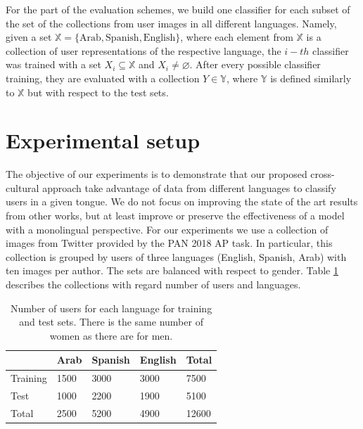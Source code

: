 \documentclass[runningheads]{llncs}
\begin{document}
For the part of the evaluation schemes, we build one classifier for each subset of the set of the collections from user images in all different languages.
Namely, given a set $\mathbb{X} = \{\text{Arab}, 
\text{Spanish}, \text{English}\}$, where each element
from $\mathbb{X}$ is a collection of user representations
of the respective language, the $i-th$ classifier was trained
with a set $X_i \subseteq \mathbb{X}$ and $X_i \neq \varnothing$.
After every possible classifier training, they are evaluated with a collection 
$Y \in \mathbb{Y}$, where $\mathbb{Y}$ is defined similarly to
$\mathbb{X}$ but with respect to the test sets.
 


\section{Experimental setup}


The objective of our experiments is to demonstrate that our
proposed cross-cultural approach take advantage of data from
different languages to classify users in a given tongue.
We do not focus on improving the state of the art results from
other works, but at least improve or preserve the effectiveness of a model with a 
monolingual perspective. For our experiments
we use a collection of images from Twitter provided by the PAN 2018 AP task.
In particular, this collection is grouped by users of three languages (English, 
Spanish, Arab) with ten images per author. The sets are balanced with respect
to gender. Table \ref{table-datasets} describes the collections with regard
number of users and languages.


\begin{table}[]
\centering
\caption{Number of users for each language for training and test sets. There is the same number of women as there are for men.}
\label{table-datasets}
\begin{tabular}{@{}lllll@{}}
\toprule
         & Arab & Spanish & English & Total \\ \midrule
Training & 1500 & 3000    & 3000    & 7500  \\ \midrule
Test     & 1000 & 2200    & 1900    & 5100  \\\midrule
Total    & 2500 & 5200    & 4900    & 12600 \\ \bottomrule
\end{tabular}
\end{table}
\end{document}
